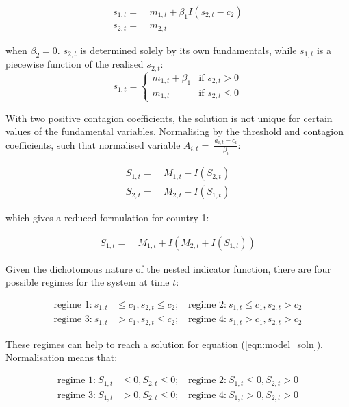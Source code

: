 \documentclass[../base.tex]{subfiles}
\begin{document}
\begin{align*}
	s_{1,t} =&~ m_{1,t} + \beta_1 I(s_{2,t} - c_2) \\
	s_{2,t} =&~ m_{2,t}
\end{align*}

when $\beta_2 = 0$. $s_{2,t}$ is determined solely by its own fundamentals, while $s_{1,t}$ is a piecewise function of the realised $s_{2,t}$:
\[
s_{1,t} = 
\begin{cases} 
m_{1,t} + \beta_1  & \text{if } s_{2,t} > 0 \\
m_{1,t}		       & \text{if } s_{2,t} \leq 0
\end{cases}
\]

With two positive contagion coefficients, the solution is not unique for certain values of the fundamental variables. Normalising by the threshold and contagion coefficients, such that normalised variable $A_{i,t} =~\frac{a_{i,t} - c_i}{\beta_i}$:

\begin{align*}
	S_{1,t} =&~ M_{1,t} + I(S_{2,t})\\
	S_{2,t} =&~ M_{2,t} + I(S_{1,t})
\end{align*}

which gives a reduced formulation for country 1:

\begin{align}
	S_{1,t} =&~ M_{1,t} + I(M_{2,t} + I(S_{1,t}))
	\label{eqn:model_soln}
\end{align}

Given the dichotomous nature of the nested indicator function, there are four possible regimes for the system at time $t$:

\begin{align}
	\label{eqn:regions}
	\text{regime 1:}~ s_{1,t} & \leq	c_1, s_{2,t} \leq c_2; ~~~~ \text{regime 2:}~ s_{1,t} \leq	c_1, s_{2,t} > c_2 \\
	\text{regime 3:}~ s_{1,t} & >	c_1, s_{2,t} \leq c_2; ~~~~ \text{regime 4:}~ s_{1,t} >	c_1, s_{2,t} > c_2
\end{align}

These regimes can help to reach a solution for equation (\ref{eqn:model_soln}). Normalisation means that:

\begin{align*}
	\text{regime 1:}~ S_{1,t} & \leq	0, S_{2,t} \leq 0; ~~~~ \text{regime 2:}~ S_{1,t} \leq	0, S_{2,t} > 0 \\
	\text{regime 3:}~ S_{1,t} & >	0, S_{2,t} \leq 0; ~~~~ \text{regime 4:}~ S_{1,t} >	0, S_{2,t} > 0
\end{align*}
\end{document}
